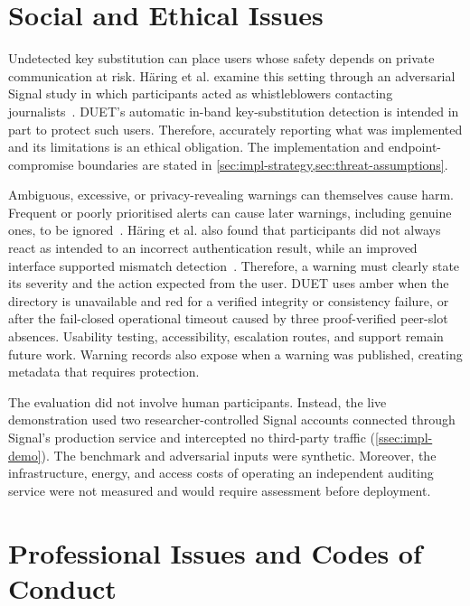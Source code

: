 \section{Social and Ethical Issues}\label{sec:lsepi-social}

Undetected key substitution can place users whose safety depends on private communication at risk.
H\"aring et al. examine this setting through an adversarial Signal study in which participants acted
as whistleblowers contacting journalists~\cite{haring2024whistleblower}.
DUET's automatic in-band key-substitution
detection is intended in part to protect such users. Therefore, accurately reporting what was
implemented and its limitations is an ethical obligation. The implementation and
endpoint-compromise boundaries are stated in
\cref{sec:impl-strategy,sec:threat-assumptions}.

Ambiguous, excessive, or privacy-revealing warnings can themselves cause harm. Frequent or poorly
prioritised alerts can cause later warnings, including genuine ones, to be
ignored~\cite{ewaschuk2016monitoring,laubheimer2022alertfatigue}. H\"aring et al. also found that
participants did not always react as intended to an incorrect authentication result, while an
improved interface supported mismatch detection~\cite[Section~4.1]{haring2024whistleblower}.
Therefore, a warning must clearly state its severity
and the action expected from the user. DUET uses amber when the directory is unavailable and red for
a verified integrity or consistency failure, or after the fail-closed operational timeout caused by
three proof-verified peer-slot absences. Usability testing, accessibility, escalation
routes, and support remain future work. Warning records also expose when a warning was published,
creating metadata that requires protection.

The evaluation did not involve human participants. Instead, the live demonstration used two
researcher-controlled Signal accounts connected through Signal's production service and intercepted
no third-party traffic (\cref{ssec:impl-demo}). The benchmark and adversarial inputs were
synthetic. Moreover, the infrastructure, energy, and access costs of operating an independent auditing service
were not measured and would require assessment before deployment.

\section{Professional Issues and Codes of Conduct}\label{sec:lsepi-prof}

